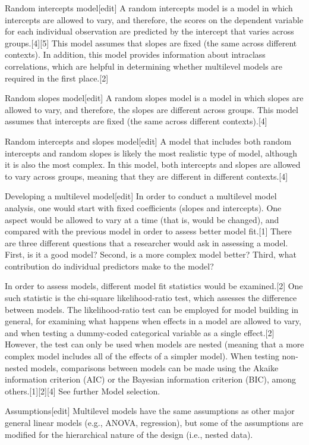 Random intercepts model[edit]
A random intercepts model is a model in which intercepts are allowed to vary, and therefore, the scores on the dependent variable for each individual observation are predicted by the intercept that varies across groups.[4][5] This model assumes that slopes are fixed (the same across different contexts). In addition, this model provides information about intraclass correlations, which are helpful in determining whether multilevel models are required in the first place.[2]

Random slopes model[edit]
A random slopes model is a model in which slopes are allowed to vary, and therefore, the slopes are different across groups. This model assumes that intercepts are fixed (the same across different contexts).[4]

Random intercepts and slopes model[edit]
A model that includes both random intercepts and random slopes is likely the most realistic type of model, although it is also the most complex. In this model, both intercepts and slopes are allowed to vary across groups, meaning that they are different in different contexts.[4]

Developing a multilevel model[edit]
In order to conduct a multilevel model analysis, one would start with fixed coefficients (slopes and intercepts). One aspect would be allowed to vary at a time (that is, would be changed), and compared with the previous model in order to assess better model fit.[1] There are three different questions that a researcher would ask in assessing a model. First, is it a good model? Second, is a more complex model better? Third, what contribution do individual predictors make to the model?

In order to assess models, different model fit statistics would be examined.[2] One such statistic is the chi-square likelihood-ratio test, which assesses the difference between models. The likelihood-ratio test can be employed for model building in general, for examining what happens when effects in a model are allowed to vary, and when testing a dummy-coded categorical variable as a single effect.[2] However, the test can only be used when models are nested (meaning that a more complex model includes all of the effects of a simpler model). When testing non-nested models, comparisons between models can be made using the Akaike information criterion (AIC) or the Bayesian information criterion (BIC), among others.[1][2][4] See further Model selection.

Assumptions[edit]
Multilevel models have the same assumptions as other major general linear models (e.g., ANOVA, regression), but some of the assumptions are modified for the hierarchical nature of the design (i.e., nested data).

